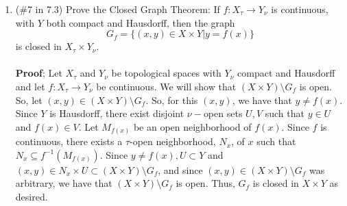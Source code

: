 \documentclass[12pt]{article}
\begin{document}
\begin{enumerate}
\item (\#7 in 7.3) Prove the Closed Graph Theorem: If $f: X_{\tau} \to Y_{\nu}$ is continuous, with $Y$ both compact and Hausdorff, then the graph $$G_f = \{(x,y) \in X\times Y | y=f(x)\}$$ is closed in $X_{\tau}\times Y_{\nu}$.\\\\

\textbf{Proof}; Let $X_{\tau}$ and $Y_{\nu}$ be topological spaces with $Y_{\nu}$ compact and Hausdorff and let $f:X_{\tau}\rightarrow Y_{\nu}$ be continuous. We will show that $(X\times Y)\setminus G_f$ is open. So, let $(x,y)\in(X\times Y)\setminus G_f$. So, for this $(x,y)$, we have that $y\neq f(x)$. Since $Y$ is Hausdorff, there exist disjoint $\nu-$open sets $U,V$ such that $y\in U$ and $f(x)\in V$. Let $M_{f(x)}$ be an open neighborhood of $f(x)$. Since $f$ is continuous, there exists a $\tau$-open neighborhood, $N_x$, of $x$ such that $N_x\subseteq f^{-1}(M_{f(x)})$. Since $y\neq f(x), U\subset Y$ and $(x,y)\in N_x\times U\subset(X\times Y)\setminus G_f$, and since $(x,y)\in(X\times Y)\setminus G_f$ was arbitrary, we have that $(X\times Y)\setminus G_f$ is open. Thus, $G_f$ is closed in $X\times Y$ as desired.





\end{enumerate}
\end{document}
